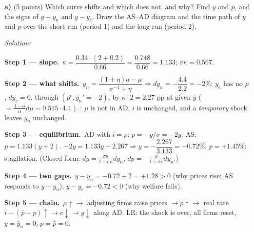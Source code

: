 \documentclass[11pt,a4paper]{article}
\newif\ifsolucoes
\newcommand{\espacoresol}{6.5cm}
\newcommand{\resolespaco}{\ifsolucoes\else\par\textit{Solution:}\vspace{\espacoresol}\par\fi}
\newcommand{\passo}[2]{\par\smallskip\noindent\textbf{Step #1.}~#2}
\begin{document}
\textbf{a)} (5 points) Which curve shifts and which does not, and why? Find $y$ and $p$, and the signs
of $y-y_n$ and $y-y_e$. Draw the AS--AD diagram and the time path of $y$ and $p$ over the short run
(period 1) and the long run (period 2).
\resolespaco
\begin{sol}
\passo{1 --- slope}{$\kappa=\dfrac{0.34\cdot(2+0.2)}{0.66}=\dfrac{0.748}{0.66}=1.133$; $\sigma\kappa=0.567$.}
\passo{2 --- what shifts}{$y_n=\dfrac{(1+\eta)a-\mu}{\sigma^{-1}+\eta}\Rightarrow dy_n=-\dfrac{4.4}{2.2}=\boxed{-2\%}$;
$y_e$ has no $\mu$, $dy_e=0$. \boxed{\text{AS shifts up/left}} through $(p^e,y_n'=-2)$, by
$\kappa\cdot2=2.27$ pp at given $y$ ($=\frac{1-\alpha}{\alpha}d\mu=0.515\cdot4.4$ \checkmark).
\boxed{\text{AD does not shift}}: $\mu$ is not in AD, $i$ is unchanged, and a \emph{temporary} shock leaves $\bar y_n$ unchanged.}
\passo{3 --- equilibrium}{AD with $i=\rho$: $p=-y/\sigma=-2y$. AS: $p=1.133(y+2)$.
$-2y=1.133y+2.267\Rightarrow y=-\dfrac{2.267}{3.133}=\boxed{-0.72\%}$, $\boxed{p=+1.45\%}$: stagflation.
(Closed form: $dy=\frac{\sigma\kappa}{1+\sigma\kappa}dy_n$, $dp=-\frac{\kappa}{1+\sigma\kappa}dy_n$.)}
\passo{4 --- two gaps}{$\boxed{y-y_n=-0.72+2=+1.28>0}$ (why prices rise: AS responds to $y-y_n$);
$\boxed{y-y_e=-0.72<0}$ (why welfare falls).}
\passo{5 --- chain}{$\mu\uparrow\rightarrow$ adjusting firms raise prices $\rightarrow p\uparrow
\rightarrow$ real rate $i-(\bar p-p)\uparrow\rightarrow c\downarrow\rightarrow y\downarrow$ along AD.
LR: the shock is over, all firms reset, $y=\bar y_n=0$, $p=\bar p=0$.}
\begin{center}
\end{center}
\end{sol}
\end{document}
